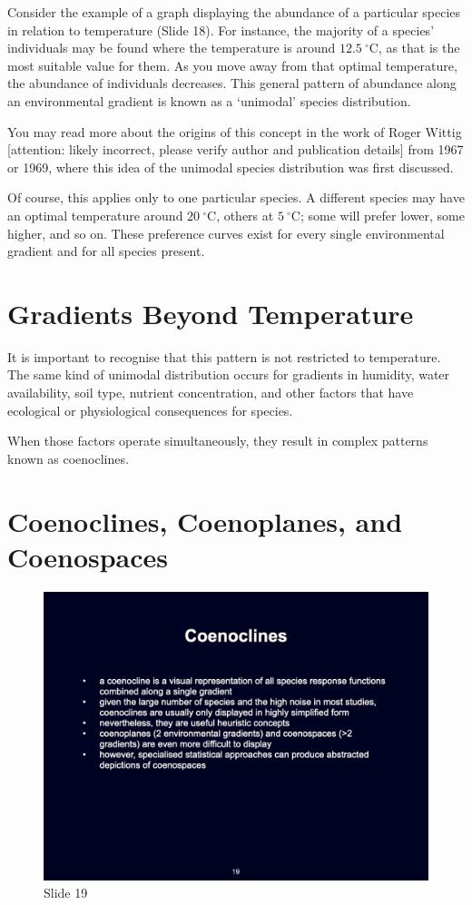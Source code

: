 \documentclass[
  10pt,
]{book}
\begin{document}
Consider the example of a graph displaying the abundance of a particular
species in relation to temperature (Slide 18). For instance, the
majority of a species' individuals may be found where the temperature is
around \(12.5~^\circ\text{C}\), as that is the most suitable value for
them. As you move away from that optimal temperature, the abundance of
individuals decreases. This general pattern of abundance along an
environmental gradient is known as a `unimodal' species distribution.

You may read more about the origins of this concept in the work of Roger
Wittig {[}attention: likely incorrect, please verify author and
publication details{]} from 1967 or 1969, where this idea of the
unimodal species distribution was first discussed.

Of course, this applies only to one particular species. A different
species may have an optimal temperature around \(20~^\circ\text{C}\),
others at \(5~^\circ\text{C}\); some will prefer lower, some higher, and
so on. These preference curves exist for every single environmental
gradient and for all species present.

\section{Gradients Beyond
Temperature}\label{gradients-beyond-temperature}

It is important to recognise that this pattern is not restricted to
temperature. The same kind of unimodal distribution occurs for gradients
in humidity, water availability, soil type, nutrient concentration, and
other factors that have ecological or physiological consequences for
species.

When those factors operate simultaneously, they result in complex
patterns known as coenoclines.

\section{Coenoclines, Coenoplanes, and
Coenospaces}\label{coenoclines-coenoplanes-and-coenospaces}

\begin{figure}[ht]
\centering
\includegraphics[width=0.8\linewidth]{../images/BDC334/BDC334-019.jpeg}
\caption*{Slide 19}
\end{figure}
\end{document}
